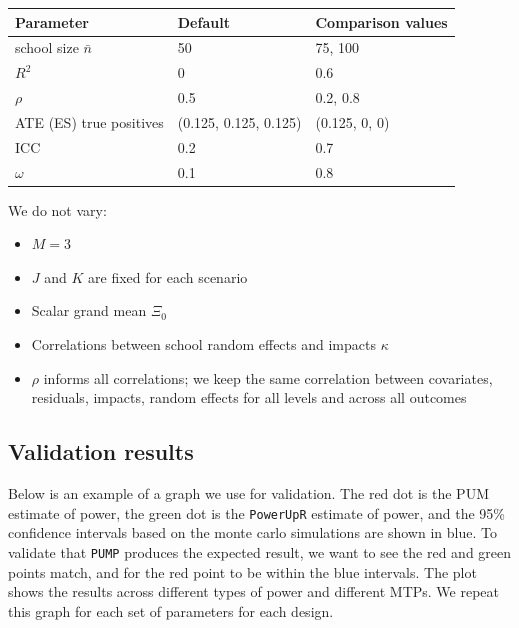 \documentclass[
]{article}
\providecommand{\tightlist}{%
  \setlength{\itemsep}{0pt}\setlength{\parskip}{0pt}}
\begin{document}
\begin{longtable}[]{@{}lll@{}}
\toprule
Parameter & Default & Comparison values \\
\midrule
\endhead
school size \(\bar{n}\) & 50 & 75, 100 \\
\(R^2\) & 0 & 0.6 \\
\(\rho\) & 0.5 & 0.2, 0.8 \\
ATE (ES) true positives & (0.125, 0.125, 0.125) & (0.125, 0, 0) \\
ICC & 0.2 & 0.7 \\
\(\omega\) & 0.1 & 0.8 \\
\bottomrule
\end{longtable}

We do not vary:

\begin{itemize}
\tightlist
\item
  \(M = 3\)
\item
  \(J\) and \(K\) are fixed for each scenario
\item
  Scalar grand mean \(\Xi_0\)
\item
  Correlations between school random effects and impacts \(\kappa\)
\item
  \(\rho\) informs all correlations; we keep the same correlation
  between covariates, residuals, impacts, random effects for all levels
  and across all outcomes
\end{itemize}

\subsection{Validation results}

Below is an example of a graph we use for validation. The red dot is the
PUM estimate of power, the green dot is the \texttt{PowerUpR} estimate
of power, and the 95\% confidence intervals based on the monte carlo
simulations are shown in blue. To validate that \texttt{PUMP} produces
the expected result, we want to see the red and green points match, and
for the red point to be within the blue intervals. The plot shows the
results across different types of power and different MTPs. We repeat
this graph for each set of parameters for each design.
\end{document}
